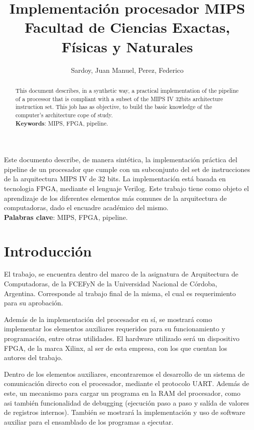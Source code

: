 \documentclass[12pt]{article}
\title{Implementación procesador MIPS\\ Facultad de Ciencias Exactas, Físicas y Naturales}
\author{Sardoy, Juan Manuel\inst{1}, Perez, Federico\inst{1}}
\begin{document}
\maketitle

\begin{resumen}
  Este documento describe, de manera sintética, la implementación práctica del pipeline de un procesador que cumple con un subconjunto del set de instrucciones de la arquitectura MIPS IV de 32 bits. La implementación está basada en tecnologia FPGA, mediante el lenguaje Verilog. Este trabajo tiene como objeto el aprendizaje de los diferentes elementos más comunes de la arquitectura de computadoras, dado el encuadre académico del mismo.\\
  \textbf{Palabras clave}: MIPS, FPGA, pipeline.
\end{resumen}

\begin{abstract}
  This document describes, in a synthetic way, a practical implementation of the pipeline of a processor that is compliant with a subset of the MIPS IV 32bits architecture instruction set. This job has as objective, to build the basic knowledge of the computer's architecture cope of study. \\
  \textbf{Keywords}: MIPS, FPGA, pipeline.
\end{abstract}

\section{Introducción}

El trabajo, se encuentra dentro del marco de la asignatura de Arquitectura de Computadoras, de la FCEFyN de la Universidad Nacional de Córdoba, Argentina. Corresponde al trabajo final de la misma, el cual es requerimiento para su aprobación.

Además de la implementación del procesador en sí, se mostrará como implementar los elementos auxiliares requeridos para su funcionamiento y programación, entre otras utilidades. El hardware utilizado será un dispositivo FPGA, de la marca Xilinx, al ser de esta empresa, con los que cuentan los autores del trabajo.

Dentro de los elementos auxiliares, encontraremos el desarrollo de un sistema de comunicación directo con el procesador, mediante el protocolo UART. Además de este, un mecanismo para cargar un programa en la RAM del procesador, como asi también funcionalidad de debugging (ejecución paso a paso y salída de valores de registros internos). También se mostrará la implementación y uso de software auxiliar para el ensamblado de los programas a ejecutar.
\end{document}
